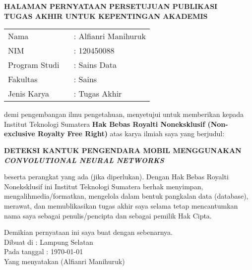 \clearpage
{}%

\begin{center}
	\smallskip
	
	\normalsize \bfseries \MakeUppercase{
		HALAMAN PERNYATAAN PERSETUJUAN PUBLIKASI \\
		TUGAS AKHIR UNTUK KEPENTINGAN AKADEMIS
	}\linebreak
	
	\normalsize \normalfont \onehalfspacing {}
	
	\flushleft
	\setlength{\tabcolsep}{0pt}
	\begin{tabular}{l l}
		Nama 			&  : Alfianri Manihuruk\\
		NIM 			&  : 120450088\\
		Program Studi \	&  : Sains Data\\
		Fakultas 		&  : Sains\\
		Jenis Karya 	&  : Tugas Akhir\\
	\end{tabular}

	\justifying
	demi pengembangan ilmu pengetahuan, menyetujui untuk memberikan kepada Institut Teknologi Sumatera \textbf{Hak Bebas Royalti Noneksklusif (Non-exclusive Royalty Free Right)} atas karya ilmiah saya yang berjudul: 
	
	\centering
	\textbf{DETEKSI KANTUK PENGENDARA MOBIL MENGGUNAKAN \textit{CONVOLUTIONAL NEURAL NETWORKS}}
	
	\justifying
	beserta perangkat yang ada (jika diperlukan). Dengan Hak Bebas Royalti Noneksklusif ini Institut Teknologi Sumatera berhak menyimpan, mengalihmedia/formatkan, mengelola dalam bentuk pangkalan data (database), merawat, dan memublikasikan tugas akhir saya selama tetap mencantumkan nama saya sebagai penulis/pencipta dan sebagai pemilik Hak Cipta.
	
	Demikian pernyataan ini saya buat dengan sebenarnya. \\
	
	\centering
	Dibuat di : Lampung Selatan\\
	Pada tanggal : \today{}\\ %
	\vspace{3cm}
	Yang menyatakan (Alfianri Manihuruk)
	
	
\end{center}
\clearpage
